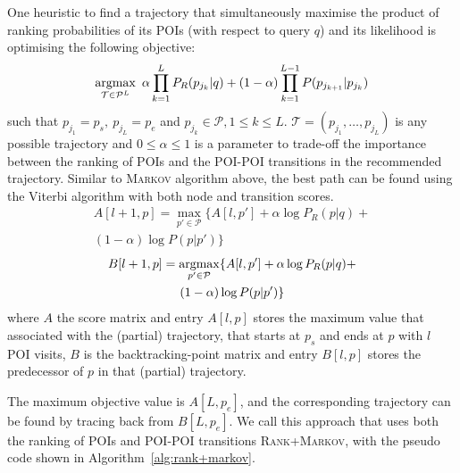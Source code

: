 One heuristic to find a trajectory that simultaneously maximise the product of ranking probabilities
of its POIs (with respect to query $q$) and its likelihood is optimising the following objective:
\begin{equation*}
    \operatorname*{argmax}_{\mathcal{T} \in \mathcal{P}^L} ~\alpha \prod_{k=1}^{L} P_R(p_{j_k} | q) +
                                     (1-\alpha) \prod_{k=1}^{L-1} P(p_{j_{k+1}} | p_{j_k})
\end{equation*}
such that
$p_{j_1} = p_s, ~ p_{j_L} = p_e$ and
$p_{j_k} \in \mathcal{P}, 1 \le k \le L$.
$\mathcal{T} = (p_{j_1}, \dots, p_{j_L})$ is any possible trajectory and
$0 \le \alpha \le 1$ is a parameter to trade-off the importance between the ranking of POIs
and the POI-POI transitions in the recommended trajectory.
Similar to \textsc{Markov} algorithm above, the best path can be found using the Viterbi algorithm with both node and transition scores. 
\begin{multline}
    \label{eq:max}
    A[l+1, p] = \max_{p' \in \mathcal{P}} \{ A[l, p'] + \alpha \log P_R(p|q) + \\ (1-\alpha) \log P(p|p') \}
\end{multline}
\begin{multline}
    \label{eq:argmax}
    B[l+1, p] = \operatorname*{argmax}_{p' \in \mathcal{P}} \{ A[l, p'] + \alpha \log P_R(p|q) + \\ (1-\alpha) \log P(p|p') \}
\end{multline}
where $A$ the score matrix and entry $A[l, p]$ stores the maximum value that associated with the (partial) trajectory, 
that starts at $p_s$ and ends at $p$ with $l$ POI visits,
$B$ is the backtracking-point matrix and entry $B[l, p]$ stores the predecessor of $p$ in that (partial) trajectory.

The maximum objective value is $A[L, p_e]$,
and the corresponding trajectory can be found by tracing back from $B[L, p_e]$.
We call this approach that uses both the ranking of POIs and POI-POI transitions \textsc{Rank+Markov},
with the pseudo code shown in Algorithm~\ref{alg:rank+markov}.

